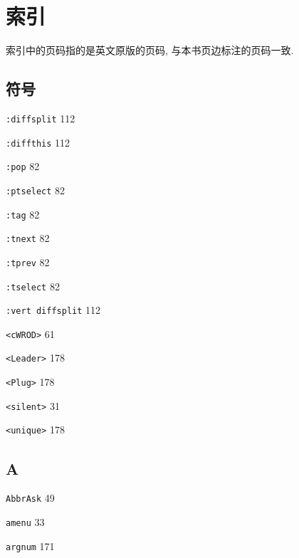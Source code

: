 \chapter{索引}
\label{chap:index}

索引中的页码指的是英文原版的页码, 与本书页边标注的页码一致.

\setlength\parindent{0pt}
\setlength\columnsep{1.5cm}
\setlength\columnseprule{0.4pt}

\begin{multicols}{2}

\hangindent=2pc  \section*{符号}

\hangindent=2pc  \texttt{:diffsplit} 112

\hangindent=2pc  \texttt{:diffthis} 112

\hangindent=2pc  \texttt{:pop} 82

\hangindent=2pc  \texttt{:ptselect} 82

\hangindent=2pc  \texttt{:tag} 82

\hangindent=2pc  \texttt{:tnext} 82

\hangindent=2pc  \texttt{:tprev} 82

\hangindent=2pc  \texttt{:tselect} 82

\hangindent=2pc  \texttt{:vert diffsplit} 112

\hangindent=2pc  \texttt{<cWROD>} 61

\hangindent=2pc  \texttt{<Leader>} 178

\hangindent=2pc  \texttt{<Plug>} 178

\hangindent=2pc  \texttt{<silent>} 31

\hangindent=2pc  \texttt{<unique>} 178

\hangindent=2pc  \section*{A}

\hangindent=2pc  \texttt{AbbrAsk} 49

\hangindent=2pc  \texttt{amenu} 33

\hangindent=2pc  \texttt{argnum} 171


\end{multicols}
